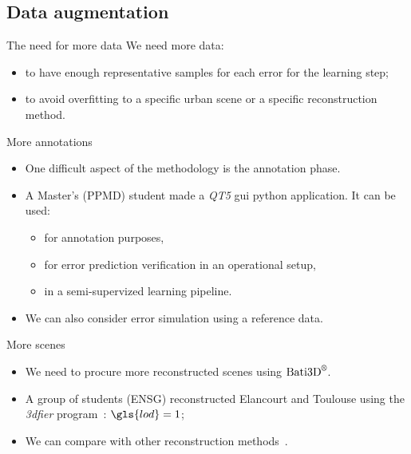 \documentclass{beamer}
\begin{document}
        \subsection{Data augmentation}
            \begin{frame}{The need for more data}
                We need more data:
                \begin{itemize}[label=$\blacktriangleright$, font=\color{IGNGreen}]
                    \item to have enough representative samples for each error for the learning step;
                    \item to avoid overfitting to a specific urban scene or a specific reconstruction method.
                \end{itemize}
            \end{frame}
            \begin{frame}{More annotations}
                \begin{itemize}[label=$\blacktriangleright$, font=\color{IGNGreen}]
                    \item<1-> One difficult aspect of the methodology is the annotation phase.
                    \item<2-> A Master's (PPMD) student made a \emph{QT5} \acrshort{gui} python application. It can be used:
                    \begin{itemize}[label=--]
                        \item<3-> for annotation purposes,
                        \item<4-> for error prediction verification in an operational setup,
                        \item<5-> in a semi-supervized learning pipeline.
                    \end{itemize}
                    \item<6-> We can also consider error simulation using a reference data.
                \end{itemize}
            \end{frame}
            \begin{frame}{More scenes}
                \begin{itemize}[label=$\blacktriangleright$, font=\color{IGNGreen}]
                    \item<1-> We need to procure more reconstructed scenes using $\text{Bati3D}^\text{\textregistered}$.
                    \item<2-> A group of students (ENSG) reconstructed Elancourt and Toulouse using the \emph{3dfier} program~\citep{ledoux2011topologically}: $\gls{lod} = 1$;
                    \item<3-> We can compare with other reconstruction methods~\citep{Lafarge2012,kelly2017bigsur}.
                \end{itemize}
            \end{frame}
\end{document}
